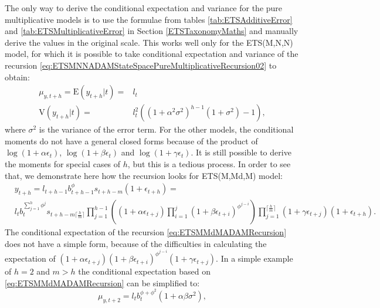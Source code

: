 \documentclass[
]{book}
\theoremstyle{definition}
\theoremstyle{definition}
\theoremstyle{definition}
\theoremstyle{definition}
\theoremstyle{remark}
\begin{document}
The only way to derive the conditional expectation and variance for the pure multiplicative models is to use the formulae from tables \ref{tab:ETSAdditiveError} and \ref{tab:ETSMultiplicativeError} in Section \ref{ETSTaxonomyMaths} and manually derive the values in the original scale. This works well only for the ETS(M,N,N) model, for which it is possible to take conditional expectation and variance of the recursion \eqref{eq:ETSMNNADAMStateSpacePureMultiplicativeRecursion02} to obtain:
\begin{equation}
    \begin{aligned}
        \mu_{y,t+h} = \mathrm{E}(y_{t+h}|t) = & l_{t} \\
        \mathrm{V}(y_{t+h}|t) = & l_{t}^2 \left(  \left(1+ \alpha^2 \sigma^2 \right)^{h-1} (1 + \sigma^2) -1 \right),
    \end{aligned}
    \label{eq:ETSMNNADAMConditionalValues}
\end{equation}
where \(\sigma^2\) is the variance of the error term. For the other models, the conditional moments do not have a general closed forms because of the product of \(\log(1+\alpha\epsilon_t)\), \(\log(1+\beta\epsilon_t)\) and \(\log(1+\gamma\epsilon_t)\). It is still possible to derive the moments for special cases of \(h\), but this is a tedious process. In order to see that, we demonstrate here how the recursion looks for ETS(M,Md,M) model:
\begin{equation}
    \begin{aligned}
        & y_{t+h} = l_{t+h-1} b_{t+h-1}^\phi s_{t+h-m} \left(1 + \epsilon_{t+h} \right) = \\
        & l_{t} b_{t}^{\sum_{j=1}^h{\phi^j}} s_{t+h-m\lceil\frac{h}{m}\rceil} \prod_{j=1}^{h-1} \left( (1 + \alpha \epsilon_{t+j}) \prod_{i=1}^{j} (1 + \beta \epsilon_{t+i})^{\phi^{j-i}} \right) \prod_{j=1}^{\lceil\frac{h}{m}\rceil} \left(1 + \gamma \epsilon_{t+j}\right) \left(1 + \epsilon_{t+h} \right) .
    \end{aligned}
    \label{eq:ETSMMdMADAMRecursion}
\end{equation}
The conditional expectation of the recursion \eqref{eq:ETSMMdMADAMRecursion} does not have a simple form, because of the difficulties in calculating the expectation of \((1 + \alpha \epsilon_{t+j})(1 + \beta \epsilon_{t+i})^{\phi^{j-i}}(1 + \gamma \epsilon_{t+j})\). In a simple example of \(h=2\) and \(m>h\) the conditional expectation based on \eqref{eq:ETSMMdMADAMRecursion} can be simplified to:
\begin{equation}
    \mu_{y,t+2} = l_{t} b_{t}^{\phi+\phi^2} \left(1 + \alpha \beta \sigma^2 \right),
    \label{eq:ETSMMdMADAMRecursionHorizon2}
\end{equation}
\end{document}
